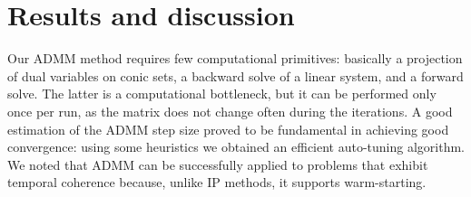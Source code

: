\documentclass[11pt]{nodycon2021}
\begin{document}
\section{Results and discussion}
 
Our ADMM method requires few computational primitives: basically a projection of dual variables on conic sets, a backward solve of a linear system, and a forward solve. The latter is a computational bottleneck, but it can be performed only once per run, as the matrix does not change often during the iterations. 
A good estimation of the ADMM step size proved to be fundamental in achieving good convergence: using some heuristics we obtained an efficient auto-tuning algorithm. 
We noted that ADMM can be successfully applied to problems that exhibit temporal coherence because, unlike IP methods, it supports warm-starting.









 
\end{document}
